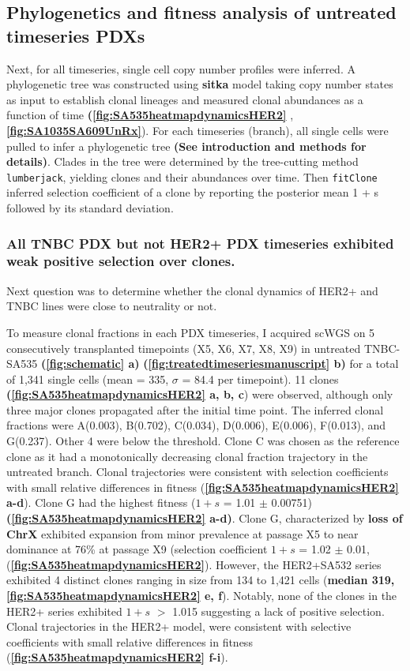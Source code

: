 \subsection{Phylogenetics and fitness analysis of untreated timeseries PDXs}
 Next, for all timeseries, single cell copy number profiles were inferred. A phylogenetic tree was constructed using \textbf{sitka} model taking copy number states as input to establish clonal lineages and measured clonal abundances as a function of time \textbf{(\autoref{fig:SA535heatmapdynamicsHER2} }, \textbf{\autoref{fig:SA1035SA609UnRx}}). For each timeseries (branch),   all single cells were pulled to infer a phylogenetic tree \textbf{(See introduction and methods for details)}. Clades in the tree were determined by the tree-cutting method \texttt{lumberjack}, yielding clones and their abundances over time. Then \texttt{fitClone} inferred selection coefficient of a clone by reporting the posterior mean 1 + s followed by its standard deviation.

\subsubsection{All TNBC PDX but not HER2+ PDX timeseries exhibited weak positive selection over clones.}
Next question was to determine whether the clonal dynamics of HER2+ and TNBC lines were close to neutrality or not.

To measure clonal fractions in each PDX timeseries, I acquired scWGS on 5 consecutively transplanted timepoints (X5, X6, X7, X8, X9) in untreated TNBC-SA535 \textbf{(\autoref{fig:schematic} a)} \textbf{(\autoref{fig:treatedtimeseriesmanuscript} b)} for a total of 1,341 single cells (mean = 335, $\sigma$ = 84.4 per timepoint).
11 clones \textbf{(\autoref{fig:SA535heatmapdynamicsHER2} a, b, c}) were observed, although only three major clones propagated after the initial time point.
The inferred clonal fractions were A(0.003), B(0.702), C(0.034), D(0.006), E(0.006), F(0.013), and G(0.237). Other 4 were below the threshold.
Clone C was chosen as the reference clone as it had a monotonically decreasing clonal fraction trajectory in the untreated branch. Clonal trajectories were consistent with selection coefficients
with small relative differences in fitness (\textbf{\autoref{fig:SA535heatmapdynamicsHER2} a-d}). Clone G had the highest fitness ($1+s$ = 1.01 $\pm$ 0.00751) \textbf{(\autoref{fig:SA535heatmapdynamicsHER2} a-d)}. 
 Clone G, characterized by \textbf{loss of ChrX} exhibited expansion from minor prevalence at passage X5 to near dominance at 76\% at passage X9 (selection coefficient $1+s$ = 1.02  $\pm$  0.01, (\textbf{\autoref{fig:SA535heatmapdynamicsHER2}}). 
 However, the HER2+SA532 series exhibited 4 distinct clones ranging in size from 134 to 1,421 cells (\textbf{median 319, \textbf{\autoref{fig:SA535heatmapdynamicsHER2} e, f}}). Notably, none of the clones in the HER2+ series exhibited $1+s$ $>$ 1.015 suggesting a lack of positive selection.
 Clonal trajectories in the HER2+ model, were consistent with selective coefficients with small relative differences in fitness (\textbf{\autoref{fig:SA535heatmapdynamicsHER2} f-i}).


